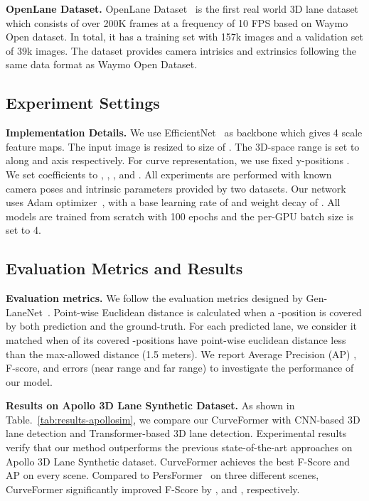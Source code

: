 \documentclass[letterpaper, 10 pt, conference]{ieeeconf}
\begin{document}
\textbf{OpenLane Dataset.} OpenLane Dataset~\cite{chen2022persformer} is the first real world 3D lane dataset which consists of over 200K frames at a frequency of 10 FPS based on Waymo Open dataset\cite{Sun_2020_CVPR, waymo_open_dataset}. In total, it has a training set with 157k images and a validation set of 39k images. The dataset provides camera intrisics and extrinsics following the same data format as Waymo Open Dataset. 


\subsection{Experiment Settings}
\textbf{Implementation Details.}  We use EfficientNet~\cite{tan2019efficientnet} as backbone which gives 4 scale feature maps. The input image is resized to size of . The 3D-space range is set to  along  and  axis respectively. 
For curve representation, we use fixed y-positions . We set coefficients to , , , and . All experiments are performed with known camera poses and intrinsic parameters provided by two datasets. Our network uses Adam optimizer~\cite{kingma2014adam}, with a base learning rate of  and weight decay of . All models are trained from scratch with 100 epochs and the per-GPU batch size is set to 4. 

\subsection{Evaluation Metrics and Results}
\textbf{Evaluation metrics.} We follow the evaluation metrics designed by Gen-LaneNet~\cite{guo2020gen}. Point-wise Euclidean distance is calculated when a -position is covered by both prediction and the ground-truth. 
For each predicted lane, we consider it matched when  of its covered -positions have point-wise euclidean distance less than the max-allowed distance (1.5 meters). We report Average Precision (AP) , F-score, and errors (near range and far range) to investigate the performance of our model. 

\textbf{Results on Apollo 3D Lane Synthetic Dataset.} As shown in Table.~\ref{tab:results-apollosim}, we compare our CurveFormer with CNN-based 3D lane detection and Transformer-based 3D lane detection. Experimental results verify that our method outperforms the previous state-of-the-art approaches on Apollo 3D Lane Synthetic dataset. 
CurveFormer achieves the best F-Score and AP on every scene. Compared to PersFormer~\cite{chen2022persformer} on three different scenes, CurveFormer significantly improved F-Score by ,   and , respectively. 
\end{document}
